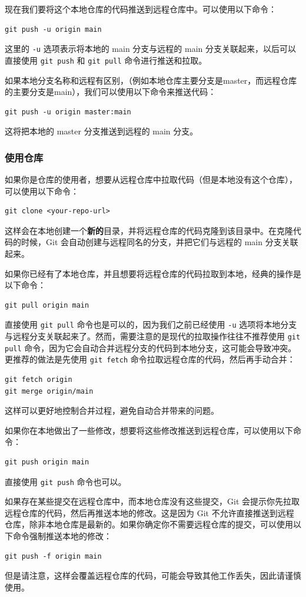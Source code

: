 \documentclass[../main.tex]{subfiles}
\begin{document}
现在我们要将这个本地仓库的代码推送到远程仓库中。可以使用以下命令：
\begin{verbatim}
git push -u origin main
\end{verbatim}
这里的 \texttt{-u} 选项表示将本地的 main 分支与远程的 main 分支关联起来，以后可以直接使用 \texttt{git push} 和 \texttt{git pull} 命令进行推送和拉取。

如果本地分支名称和远程有区别，（例如本地仓库主要分支是master，而远程仓库的主要分支是main），我们可以使用以下命令来推送代码：
\begin{verbatim}
git push -u origin master:main
\end{verbatim}
这将把本地的 master 分支推送到远程的 main 分支。

\subsubsection{使用仓库}

如果你是仓库的使用者，想要从远程仓库中拉取代码（但是本地没有这个仓库），可以使用以下命令：

\begin{verbatim}
git clone <your-repo-url>
\end{verbatim}

这样会在本地创建一个\textbf{新的}目录，并将远程仓库的代码克隆到该目录中。在克隆代码的时候，Git 会自动创建与远程同名的分支，并把它们与远程的 main 分支关联起来。

如果你已经有了本地仓库，并且想要将远程仓库的代码拉取到本地，经典的操作是以下命令：
\begin{verbatim}
git pull origin main
\end{verbatim}
直接使用 \texttt{git pull} 命令也是可以的，因为我们之前已经使用 \texttt{-u} 选项将本地分支与远程分支关联起来了。然而，需要注意的是现代的拉取操作往往不推荐使用 \texttt{git pull} 命令，因为它会自动合并远程分支的代码到本地分支，这可能会导致冲突。更推荐的做法是先使用 \texttt{git fetch} 命令拉取远程仓库的代码，然后再手动合并：
\begin{verbatim}
git fetch origin
git merge origin/main
\end{verbatim}
这样可以更好地控制合并过程，避免自动合并带来的问题。

如果你在本地做出了一些修改，想要将这些修改推送到远程仓库，可以使用以下命令：
\begin{verbatim}
git push origin main
\end{verbatim}
直接使用 \texttt{git push} 命令也可以。

如果存在某些提交在远程仓库中，而本地仓库没有这些提交，Git 会提示你先拉取远程仓库的代码，然后再推送本地的修改。这是因为 Git 不允许直接推送到远程仓库，除非本地仓库是最新的。如果你确定你不需要远程仓库的提交，可以使用以下命令强制推送本地的修改：
\begin{verbatim}
git push -f origin main
\end{verbatim}
但是请注意，这样会覆盖远程仓库的代码，可能会导致其他工作丢失，因此请谨慎使用。
\end{document}
